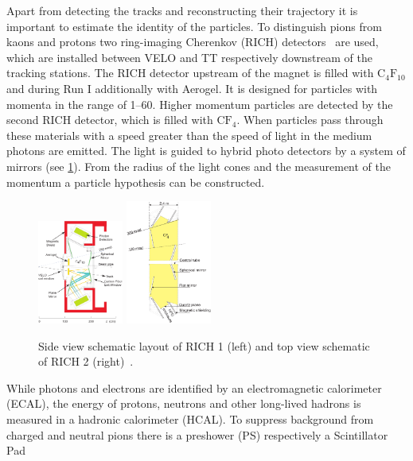 Apart from detecting the tracks and reconstructing their trajectory it is
important to estimate the identity of the particles. To distinguish pions from
kaons and protons two ring-imaging Cherenkov (RICH)
detectors~\cite{LHCb-DP-2012-003} are used, which are installed between VELO
and TT respectively downstream of the tracking stations. The RICH detector
upstream of the magnet is filled with $\mathrm{C_4F_{10}}$ and during Run I
additionally with Aerogel. It is designed for particles with momenta in the
range of \SIrange{1}{60}{\gevc}. Higher momentum particles are detected by the
second RICH detector, which is filled with $\mathrm{CF_4}$. When particles
pass through these materials with a speed greater than the speed of light in
the medium photons are emitted. The light is guided to hybrid photo detectors
by a system of mirrors (see \cref{fig:detector:rich}). From the radius of the
light cones and the measurement of the momentum a particle hypothesis can be
constructed.
\begin{figure}[htb]
\centering
\includegraphics[width=0.25\textwidth]{04-Detector/figs/rich1-2d.pdf}
\includegraphics[width=0.25\textwidth]{04-Detector/figs/rich2_schematic.pdf}
\caption{Side view schematic layout of RICH 1 (left) and top view schematic of
RICH 2 (right)~\cite{Alves:2008zz}.}
\label{fig:detector:rich}
\end{figure}
While photons and electrons are identified by an electromagnetic calorimeter
(ECAL), the energy of protons, neutrons and other long-lived hadrons is
measured in a hadronic calorimeter (HCAL). To suppress background from charged
and neutral pions there is a preshower (PS) respectively a Scintillator Pad
